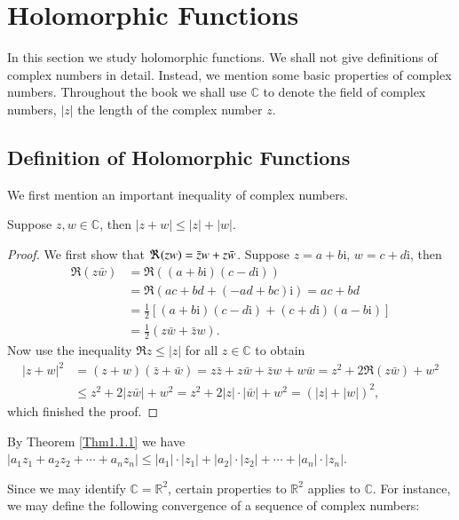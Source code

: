 \section{Holomorphic Functions}
In this section we study holomorphic functions. We shall not give definitions of complex numbers in detail. Instead, we mention some basic properties of complex numbers. Throughout the book we shall use $\mathbb{C}$ to denote the field of complex numbers, $|z|$ the length of the complex number $z$.
\subsection{Definition of Holomorphic Functions}
We first mention an important inequality of complex numbers.
\begin{theorem}\label{Thm1.1.1}
Suppose $z,w\in\mathbb{C}$, then $|z+w|\le |z|+|w|$.
\end{theorem}
\begin{proof}
We first show that $\Re(zw)=\Bar{z}w+z\Bar{w}$. Suppose $z=a+b\mathrm{i}$, $w=c+d\mathrm{i}$, then 
$$
\begin{aligned}
\Re \left( z\bar{w} \right)& =\Re \left( \left( a+b\mathrm{i} \right) \left( c-d\mathrm{i} \right) \right) 
\\
&=\Re \left( ac+bd+\left( -ad+bc \right) \mathrm{i} \right) =ac+bd
\\
&=\frac{1}{2}\left[ \left( a+b\mathrm{i} \right) \left( c-d\mathrm{i} \right) +\left( c+d\mathrm{i} \right) \left( a-b\mathrm{i} \right) \right] 
\\
&=\frac{1}{2}\left( z\bar{w}+\bar{z}w \right) .
\end{aligned}
$$
Now use the inequality $\Re z\le|z|$ for all $z\in\mathbb{C}$ to obtain 
$$
\begin{aligned}
\left| z+w \right|^2&=\left( z+w \right) \left( \bar{z}+\bar{w} \right) =z\bar{z}+z\bar{w}+\bar{z}w+w\bar{w}=z^2+2\Re \left( z\bar{w} \right) +w^2
\\
&\le z^2+2\left| z\bar{w} \right|+w^2=z^2+2\left| z \right|\cdot \left| \bar{w} \right|+w^2=\left( \left| z \right|+\left| w \right| \right) ^2,
\end{aligned}
$$
which finished the proof.
\end{proof}
By Theorem \ref{Thm1.1.1} we have $\left| a_1z_1+a_2z_2+\cdots +a_nz_n \right|\le \left| a_1 \right|\cdot \left| z_1 \right|+\left| a_2 \right|\cdot \left| z_2 \right|+\cdots +\left| a_n \right|\cdot \left| z_n \right|$.\par
Since we may identify $\mathbb{C}=\mathbb{R}^2$, certain properties to $\mathbb{R}^2$ applies to $\mathbb{C}$. For instance, we may define the following convergence of a sequence of complex numbers: 
